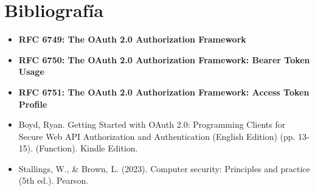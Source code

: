 \section{Bibliografía}
\begin{itemize}
    \item \textbf{RFC 6749: The OAuth 2.0 Authorization Framework}
    \item \textbf{RFC 6750: The OAuth 2.0 Authorization Framework: Bearer Token Usage}
    \item \textbf{RFC 6751: The OAuth 2.0 Authorization Framework: Access Token Profile}
    \item Boyd, Ryan. Getting Started with OAuth 2.0: Programming Clients for Secure Web API Authorization and Authentication (English Edition) (pp. 13-15). (Function). Kindle Edition. 
    \item Stallings, W., \& Brown, L. (2023). Computer security: Principles and practice (5th ed.). Pearson.
\end{itemize}

